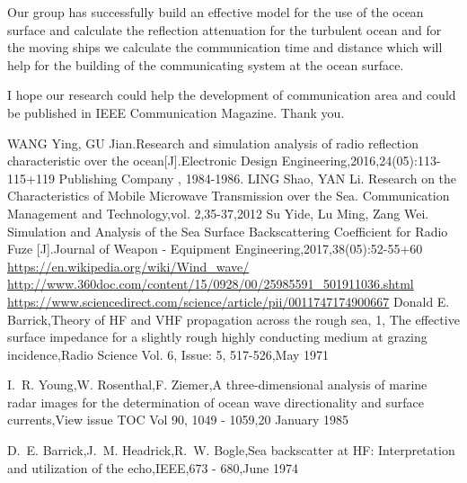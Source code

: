 \documentclass{mcmthesis}
\begin{document}
Our group has successfully build an effective model for the use of the ocean surface and calculate the reflection attenuation for the turbulent ocean and for the moving ships we calculate the communication time and distance which will help for the building of the communicating system at the ocean surface.

I hope our research could help the development of communication area and could be published in IEEE Communication Magazine. Thank you.
\begin{thebibliography}{99}%
WANG Ying, GU Jian.Research and simulation analysis of radio reflection characteristic over the ocean[J].Electronic Design Engineering,2016,24(05):113-115+119
Publishing Company , 1984-1986.
LING Shao, YAN Li. Research on the Characteristics of Mobile Microwave Transmission over the Sea. Communication Management and Technology,vol. 2,35-37,2012
Su Yide, Lu Ming, Zang Wei. Simulation and Analysis of the Sea Surface Backscattering Coefficient for Radio Fuze [J].Journal of Weapon - Equipment Engineering,2017,38(05):52-55+60
\url{https://en.wikipedia.org/wiki/Wind_wave/}
\url{http://www.360doc.com/content/15/0928/00/25985591_501911036.shtml}
\url{https://www.sciencedirect.com/science/article/pii/0011747174900667}
Donald E. Barrick,Theory of HF and VHF propagation across the rough sea, 1, The effective surface impedance for a slightly rough highly conducting medium at grazing incidence,Radio Science  Vol. 6, Issue: 5, 517-526,May 1971

I.~R. Young,W. Rosenthal,F. Ziemer,A three-dimensional analysis of marine radar images for the determination of ocean wave directionality and surface currents,View  issue TOC Vol 90, 1049 - 1059,20 January 1985

D.~E. Barrick,J.~M. Headrick,R.~W. Bogle,Sea backscatter at HF: Interpretation and utilization of the echo,IEEE,673 - 680,June 1974

\end{thebibliography}
\end{document}
